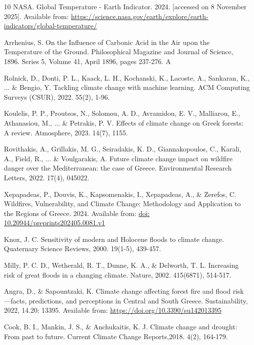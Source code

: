 \documentclass[12pt]{Definitions/academia}
\begin{document}
\begin{thebibliography}{10}
 NASA. Global Temperature - Earth Indicator. 2024.
{[}accessed on 8 November 2025{]}. Available from: \url{https://science.nasa.gov/earth/explore/earth-indicators/global-temperature/}

 Arrhenius, S. On the Influence of Carbonic Acid
in the Air upon the Temperature of the Ground. Philosophical Magazine
and Journal of Science, 1896. Series 5, Volume 41, April 1896, pages
237-276. A

Rolnick, D., Donti, P. L., Kaack, L. H., Kochanski,
K., Lacoste, A., Sankaran, K., ... \& Bengio, Y. Tackling climate
change with machine learning. ACM Computing Surveys (CSUR), 2022.
55(2), 1-96.

 Koulelis, P. P., Proutsos, N., Solomou, A.
D., Avramidou, E. V., Malliarou, E., Athanasiou, M., ... \& Petrakis,
P. V. Effects of climate change on Greek forests: A review. Atmosphere,
2023. 14(7), 1155.

 Rovithakis, A., Grillakis, M. G., Seiradakis,
K. D., Giannakopoulos, C., Karali, A., Field, R., ... \& Voulgarakis,
A. Future climate change impact on wildfire danger over the Mediterranean:
the case of Greece. Environmental Research Letters, 2022. 17(4), 045022.

 Xepapadeas, P., Douvis, K., Kapsomenakis,
I., Xepapadeas, A., \& Zerefos, C. Wildfires, Vulnerability, and Climate
Change: Methodology and Application to the Regions of Greece. 2024.
Available from: \url{doi: 10.20944/preprints202405.0081.v1}

 Knox, J. C. Sensitivity of modern and Holocene
floods to climate change. Quaternary Science Reviews, 2000. 19(1-5),
439-457.

 Milly, P. C. D., Wetherald, R. T., Dunne, K.
A., \& Delworth, T. L. Increasing risk of great floods in a changing
climate. Nature, 2002. 415(6871), 514-517.

Angra, D., \& Sapountzaki, K. Climate change
affecting forest fire and flood risk---facts, predictions, and perceptions
in Central and South Greece. Sustainability, 2022, 14.20: 13395. Available
from: \url{https://doi.org/10.3390/su142013395}

 Cook, B. I., Mankin, J. S., \& Anchukaitis, K.
J. Climate change and drought: From past to future. Current Climate
Change Reports,2018. 4(2), 164-179.


\end{thebibliography}
\end{document}
